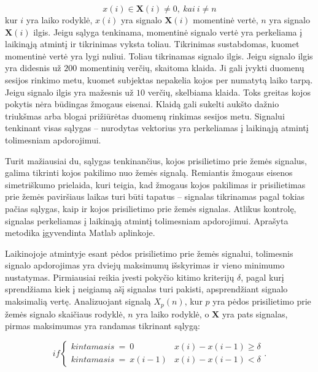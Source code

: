 \documentclass[]{vgtuef}
\begin{document}
\begin{equation}
	x(i) \in \mathbf{X}(i) \neq 0, ~kai~i \neq n
\end{equation}
kur $i$ yra laiko rodyklė, $x(i)$ yra signalo $\mathbf{X}(i)$ momentinė vertė, $n$ yra signalo $\mathbf{X}(i)$ ilgis. Jeigu sąlyga tenkinama, momentinė signalo vertė yra perkeliama į laikinąją atmintį ir tikrinimas vyksta toliau. Tikrinimas sustabdomas, kuomet momentinė vertė yra lygi nuliui. Toliau tikrinamas signalo ilgis. Jeigu signalo ilgis yra didesnis už $200$ momentinių verčių, skaitoma klaida. Ji gali įvykti duomenų sesijos rinkimo metu, kuomet subjektas nepakelia kojos per numatytą laiko tarpą. Jeigu signalo ilgis yra mažesnis už $10$ verčių, skelbiama klaida. Toks greitas kojos pokytis nėra būdingas žmogaus eisenai. Klaidą gali sukelti aukšto dažnio triukšmas arba blogai prižiūrėtas duomenų rinkimas sesijos metu. Signalui tenkinant visas sąlygas -- nurodytas vektorius yra perkeliamas į laikinąją atmintį tolimesniam apdorojimui.

Turit mažiausiai du, sąlygas tenkinančius, kojos prisilietimo prie žemės signalus, galima tikrinti kojos pakilimo nuo žemės signalą. Remiantis žmogaus eisenos simetriškumo prielaida, kuri teigia, kad žmogaus kojos pakilimas ir prisilietimas prie žemės paviršiaus laikas turi būti tapatus -- signalas tikrinamas pagal tokias pačias sąlygas, kaip ir kojos prisilietimo prie žemės signalas. Atlikus kontrolę, signalas perkeliamas į laikinąją atmintį tolimesniam apdorojimui. Aprašyta metodika įgyvendinta Matlab aplinkoje.


Laikinojoje atmintyje esant pėdos prisilietimo prie žemės signalui, tolimesnis signalo apdorojimas yra dviejų maksimumų išskyrimas ir vieno minimumo nustatymas. Pirmiausiai reikia įvesti pokyčio kitimo kriterijų $\delta$, pagal kurį sprendžiama kiek į neigiamą ašį signalas turi pakisti, apsprendžiant signalo maksimalią vertę. Analizuojant signalą $X_p(n)$, kur $p$ yra pėdos prisilietimo prie žemės signalo skaičiaus rodyklė, $n$ yra laiko rodyklė, o $\mathbf{X}$ yra pats signalas, pirmas maksimumas yra randamas tikrinant sąlygą:

\begin{equation}
	if \left\{ \begin{array}{ll}
	kintamasis~=~0 & x(i) - x(i-1) \geq \delta \\
	kintamasis~=~x(i-1) & x(i) - x(i-1) < \delta
	\end{array} \right..
\end{equation}
\end{document}
